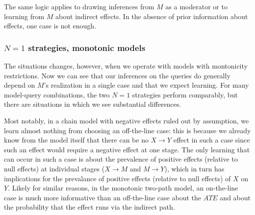 \documentclass[
  12pt,
]{book}
\begin{document}
The same logic applies to drawing inferences from \(M\) as a moderator or to learning from \(M\) about indirect effects. In the absence of prior information about effects, one case is not enough.

\hypertarget{n1-strategies-monotonic-models}{%
\subsubsection{\texorpdfstring{\(N=1\) strategies, monotonic models}{N=1 strategies, monotonic models}}\label{n1-strategies-monotonic-models}}

The situations changes, however, when we operate with models with montonicity restrictions. Now we can see that our inferences on the queries do generally depend on \(M\)'s realization in a single case and that we expect learning. For many model-query combinations, the two \(N=1\) strategies perform comparably, but there are situations in which we see substantial differences.

Most notably, in a chain model with negative effects ruled out by assumption, we learn almost nothing from choosing an off-the-line case: this is because we already know from the model itself that there can be no \(X \rightarrow Y\) effect in such a case since such an effect would require a negative effect at one stage. The only learning that can occur in such a case is about the prevalence of positive effects (relative to null effects) at individual stages (\(X \rightarrow M\) and \(M \rightarrow Y\)), which in turn has implications for the prevalance of positive effects (relative to null effects) of \(X\) on \(Y\). Likely for similar reasons, in the monotonic two-path model, an on-the-line case is much more informative than an off-the-line case about the \(ATE\) and about the probability that the effect runs via the indirect path.
\end{document}
